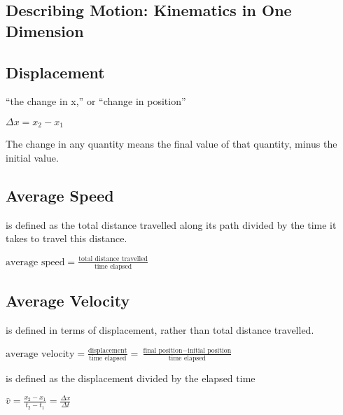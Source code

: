 \documentclass{extarticle}
\begin{document}
 

\iftoggle{editing}{%
}{%
  \begin{multicols}{4}
}




\setcounter{secnumdepth}{0}


\begin{tcolorbox}[enhanced jigsaw,sharp corners,coltext=black,colback=BurntOrange!25!white,boxrule=0pt,breakable,size=minimal]

\section{Describing Motion:
Kinematics in One Dimension}

\subsection{Displacement}
“the change in x,” or “change in position” 

$\Delta x = x_2 - x_1$

The change in any quantity means the final value of that quantity, minus the initial value.

\subsection{Average Speed}
is defined as the total distance travelled along its path divided by the time it takes to travel this distance.

$\text{average speed} = \frac{\text{total distance travelled}}{\text{time elapsed}}$

\subsection{Average Velocity}
is defined in terms of displacement, rather than total distance travelled.

$\text{average velocity} = \frac{ \text{displacement} }{ \text{time elapsed} } = \frac{ \text{final position} - \text{initial position} }{ \text{time elapsed} }$


is defined as the displacement divided by the elapsed time

$\bar{v} = \frac{x_2 - x_1}{t_2 - t_1} = \frac{\Delta x}{\Delta t}$



\end{tcolorbox}
\end{document}

